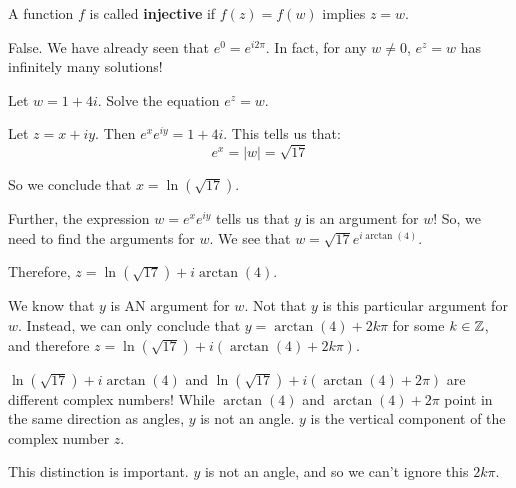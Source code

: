\begin{ex}{}{}A function $f$ is called {\bf injective} if $f(z) = f(w)$ implies $z = w$.


False. We have already seen that $e^{0} = e^{i2\pi}$. In fact, for any $w\ne 0$, $e^z =w$ has infinitely many solutions!
\end{ex}


\begin{ex}{}{} Let $w = 1 + 4i$. Solve the equation $e^z = w$.

Let $z = x + iy$. Then $e^xe^{iy} = 1+ 4i$. This tells us that:
$$e^x = |w| = \sqrt{17}$$

So we conclude that $x = \ln(\sqrt{17})$.

Further, the expression $w = e^xe^{iy}$ tells us that $y$ is an argument for $w$! So, we need to find the arguments for $w$. We see that $w = \sqrt{17}e^{i\arctan(4)}$.

Therefore, $z = \ln(\sqrt{17}) + i\arctan(4)$.


 We know that $y$ is AN argument for $w$. Not that $y$ is this particular argument for $w$. Instead, we can only conclude that $y = \arctan(4) + 2k\pi$ for some $k\in \mathbb{Z}$, and therefore $z = \ln(\sqrt{17}) + i(\arctan(4) + 2k\pi)$.
\end{ex}

\begin{note} $\ln(\sqrt{17}) + i\arctan(4)$ and $\ln(\sqrt{17}) + i(\arctan(4) + 2\pi)$ are different complex numbers! While $\arctan(4)$ and $\arctan(4) + 2\pi$ point in the same direction as angles, $y$ is not an angle. $y$ is the vertical component of the complex number $z$.

This distinction is important. $y$ is not an angle, and so we can't ignore this $2k\pi$.\end{note}

